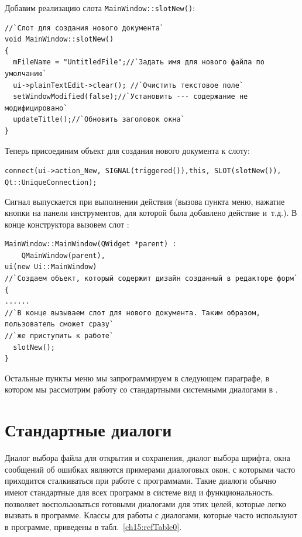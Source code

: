 Добавим реализацию слота  \lstinline!MainWindow::slotNew()!:
\begin{lstlisting}
//`Слот для создания нового документа`
void MainWindow::slotNew()
{
  mFileName = "UntitledFile";//`Задать имя для нового файла по умолчанию`
  ui->plainTextEdit->clear(); //`Очистить текстовое поле`
  setWindowModified(false);//`Установить --- содержание не модифицировано`
  updateTitle();//`Обновить заголовок окна`
}
\end{lstlisting}

Теперь присоединим объект  для создания нового документа к слоту: 

\lstinline!connect(ui->action_New, SIGNAL(triggered()),this, SLOT(slotNew()), Qt::UniqueConnection);!

Сигнал выпускается при выполнении действия (вызова пункта меню, нажатие кнопки на панели инструментов, для которой была
добавлено действие и~т.д.). В конце конструктора вызовем слот : 
\begin{lstlisting}
MainWindow::MainWindow(QWidget *parent) :
    QMainWindow(parent),
ui(new Ui::MainWindow) 
//`Создаем объект, который содержит дизайн созданный в редакторе форм`
{
......
//`В конце вызываем слот для нового документа. Таким образом, пользователь сможет сразу`
//`же приступить к работе`
  slotNew();
}
\end{lstlisting}

Остальные пункты меню мы запрограммируем в следующем параграфе, в котором мы рассмотрим работу со стандартными
системными диалогами в . 

\section[Стандартные диалоги]{Стандартные диалоги}
Диалог выбора файла для открытия и сохранения, диалог выбора шрифта, окна сообщений об ошибках являются примерами
диалоговых окон, с которыми часто приходится сталкиваться при работе с программами. Такие диалоги обычно имеют
стандартные для всех программ в системе вид и функциональность.  позволяет воспользоваться готовыми диалогами для
этих целей, которые легко вызвать в программе. Классы для работы с диалогами, которые часто используют в программе,
приведены в табл.~\ref{ch15:refTable0}.

